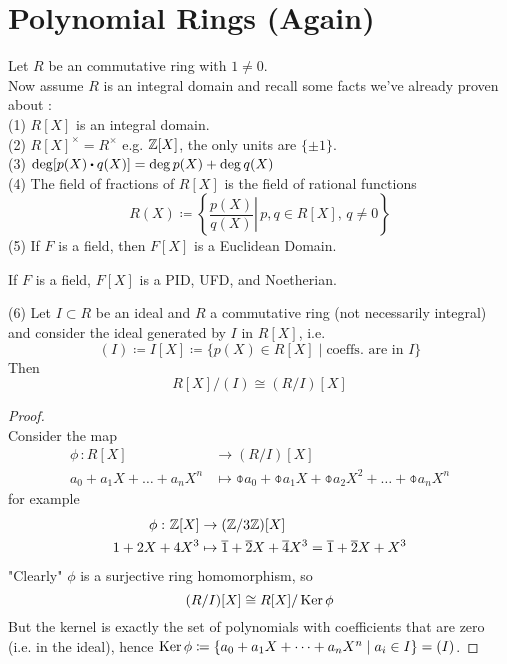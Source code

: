 \documentclass[../Main.tex]{subfiles}
\begin{document}
\section*{Polynomial Rings (Again)}
Let $R$ be an commutative ring with $1\ne 0$.\\
Now assume $R$ is an integral domain and recall some facts we've already proven about :\\
(1) $R[X]$ is an integral domain.\\
(2) $R[X]^\times=R^\times$ e.g. $\mathbb{Z}[X]$, the only units are $\{\pm 1\}$.\\
(3) $\deg[p(X)\rdot q(X)]=\deg p(X)+ \deg q(X)$\\
(4) The field of fractions of $R[X]$ is the field of rational functions
	\[R(X)\coloneqq \left\{ \left. \frac{p(X)}{q(X)} \right| \, p,q\in R[X],\, q\ne 0\right\}\]
(5) If $F$ is a field, then $F[X]$ is a Euclidean Domain.
	\begin{crl}[title = {\texorpdfstring{$F[X]$}{F[X]} is PID, UFD, and Noetherian}]
		If $F$ is a field, $F[X]$ is a PID, UFD, and Noetherian.
	\end{crl}
(6) Let $I\subset R$ be an ideal and $R$ a commutative ring (not necessarily integral) and consider the ideal generated by $I$ in $R[X]$, i.e.
	\[(I)\coloneqq I[X] \coloneqq \{p(X)\in R[X]\mid \text{coeffs. are in } I\}\]
	Then 
	\[R[X]/(I)\cong (R/I)[X]\]
\begin{proof}~\\
	Consider the map
	\begin{align*}
	\phi\,\colon R[X] &\to (R/I)[X] \\
	a_0+a_1X+\dots+a_nX^n &\mapsto \obar{a_0}+\obar{a_1}X+\obar{a_2}X^2+\dots+\obar{a_n}X^n
	\end{align*}
	for example
	\begin{align*}
	\phi\,\colon \mathbb{Z}[X] &\to (\mathbb{Z}/3\mathbb{Z})[X] \\
	1+2X+4X^3 &\mapsto \overline{1}+\overline{2}X+\overline{4}X^3=\overline{1}+\overline{2}X+X^3
	\end{align*}
	"Clearly" $\phi$ is a surjective ring homomorphism, so
	\[(R/I)[X]\cong R[X]/\operatorname{Ker} \phi\]
	But the kernel is exactly the set of polynomials with coefficients that are zero (i.e. in the ideal), hence $\operatorname{Ker}\phi\coloneqq\{a_0+a_1X+\dots+a_nX^n\mid a_i\in I\}=(I)$.
\end{proof}
\end{document}

